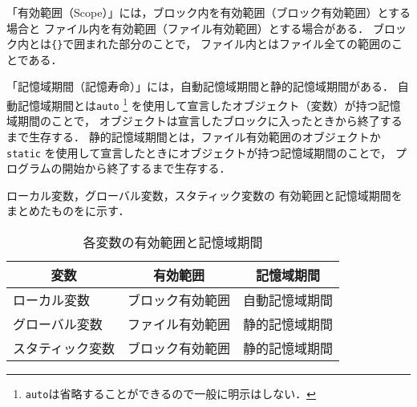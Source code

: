 

\vspace{-\baselineskip}



「有効範囲（Scope）」には，ブロック内を有効範囲（ブロック有効範囲）とする場合と
ファイル内を有効範囲（ファイル有効範囲）とする場合がある．
ブロック内とは\texttt{\{\}}で囲まれた部分のことで，
ファイル内とはファイル全ての範囲のことである．\cite{isl}



「記憶域期間（記憶寿命）」には，自動記憶域期間と静的記憶域期間がある．
自動記憶域期間とは\texttt{auto}
\footnote{\texttt{auto}は省略することができるので一般に明示はしない．}
を使用して宣言したオブジェクト（変数）が持つ記憶域期間のことで，
オブジェクトは宣言したブロックに入ったときから終了するまで生存する．
静的記憶域期間とは，ファイル有効範囲のオブジェクトか\texttt{static}
を使用して宣言したときにオブジェクトが持つ記憶域期間のことで，
プログラムの開始から終了するまで生存する．\cite{atmarkit}

\pagebreak


ローカル変数，グローバル変数，スタティック変数の
有効範囲と記憶域期間をまとめたものをに示す．
\begin{table}[htb]
	\centering
	\caption{各変数の有効範囲と記憶域期間}
	\begin{tabular}{l|c|c} \hline\hline
		\multicolumn{1}{c|}{変数} & 有効範囲 & 記憶域期間 \\ \hline
		ローカル変数     & ブロック有効範囲 & 自動記憶域期間 \\
		グローバル変数   & ファイル有効範囲 & 静的記憶域期間 \\
		スタティック変数 & ブロック有効範囲 & 静的記憶域期間 \\ \hline
	\end{tabular}
	\label{tbl:variable}
\end{table}

